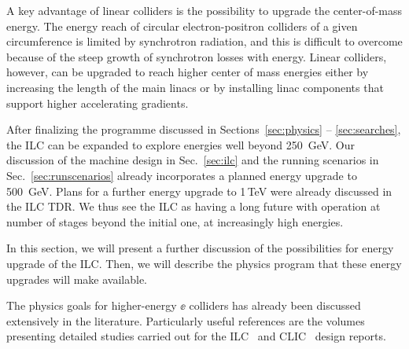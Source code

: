 


A key advantage of linear colliders is the possibility to upgrade
the center-of-mass energy.  The energy reach of circular electron-positron
colliders of a given circumference is limited by synchrotron
radiation, and this is difficult to overcome because of the steep
growth of synchrotron losses with energy.  Linear colliders, however,
can be upgraded to reach higher center of mass energies either by
increasing the length of the main linacs or by installing linac components
that support higher accelerating gradients.  

 After finalizing the programme discussed in
Sections~\ref{sec:physics} -- \ref{sec:searches}, the ILC can
be expanded to explore energies well beyond 250~GeV. Our 
discussion of the machine design in Sec.~\ref{sec:ilc} and the 
running scenarios in Sec.~\ref{sec:runscenarios} already incorporates a 
planned energy upgrade to 500~GeV.  Plans for a further energy upgrade
to 1\,TeV were already discussed in the ILC TDR.
  We thus see the ILC as having a long
future with operation at number of stages beyond the initial one, at
increasingly high energies. 

In this section, we will present a further discussion of the
possibilities for energy upgrade of the ILC.  Then, we will describe
the physics program that these energy upgrades will make available.

The physics goals for higher-energy $\ee$ colliders has already been 
discussed extensively in the literature. Particularly useful
references are the volumes presenting  detailed studies carried out for 
the ILC~\cite{Fujii:2015jha,Baer:2013cma}
and CLIC~\cite{Linssen:2012hp,deBlas:2018mhx,Roloff:2018dqu} design reports. 





